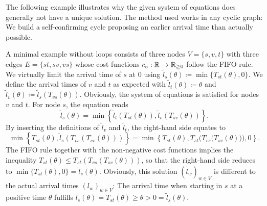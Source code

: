 The following example illustrates why the given system of equations does generally not have a unique solution.
The method used works in any cyclic graph: We build a self-confirming cycle proposing an earlier arrival time than actually possible.
\begin{example}
    A minimal example without loops consists of three nodes $V=\{ s, v, t \}$ with three edges $E=\{ st, sv, vs \}$ whose cost functions $c_e: \mathbb{R} \rightarrow \mathbb{R}_{\geq 0}$ follow the FIFO rule.
    We virtually limit the arrival time of $s$ at $0$ using $\tilde l_s (\theta) \coloneqq \min\{ T_{st}(\theta), 0 \}$.
    We define the arrival times of $v$ and $t$ as expected with $\tilde l_t(\theta) \coloneqq \theta$ and $\tilde l_v(\theta) \coloneqq \tilde l_s(T_{vs}(\theta))$.
    Obviously, the system of equations is satisfied for nodes $v$ and $t$.
    For node $s$, the equation reads \[
        \tilde l_s(\theta) = \min\left\{ \tilde l_t(T_{st}(\theta)), \tilde l_v(T_{sv}(\theta)) \right\}. 
    \]
    By inserting the definitions of $\tilde l_v$ and $\tilde l_t$, the right-hand side equates to \[
        \min\left\{ T_{st}(\theta), \tilde l_s(T_{vs}(T_{sv}(\theta))) \right\}
        = \min \left\{ T_{st}(\theta), T_{st} \Big( T_{vs}\big(T_{sv}(\theta)\big) \Big), 0 \right\}.
    \]
    The FIFO rule together with the non-negative cost functions implies the inequality $T_{st}(\theta) \leq T_{st} ( T_{vs}(T_{sv}(\theta)))$, so that the right-hand side reduces to $\min\{ T_{st}(\theta), 0 \} = \tilde l_s(\theta)$.
    Obviously, this solution $(\tilde l_w)_{w\in V}$ is different to the actual arrival times $(l_w)_{w\in V}$: The arrival time when starting in $s$ at a positive time $\theta$ fulfills $l_s(\theta) = T_{st}(\theta) \geq \theta > 0 = \tilde l_s(\theta)$.
\end{example}
